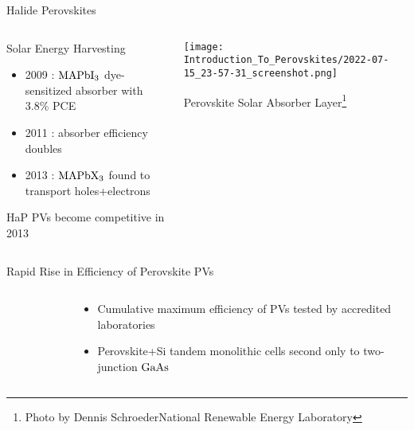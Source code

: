 \documentclass[10pt, aspectratio=169, presentation]{beamer}
\begin{document}
\begin{frame}[label={sec:org1fbe00f}]{Halide Perovskites}
\begin{columns}
\begin{column}{0.4\columnwidth}
\begin{block}{Solar Energy Harvesting}
\begin{itemize}
\item 2009 : \(\ce{MAPbI_3}\) dye-sensitized absorber with 3.8\% PCE
\autocite{kojima-2009-organ-halid}
\item 2011 : absorber efficiency doubles
\autocite{im-2011}
\item 2013 : \(\ce{MAPbX_3}\) found to transport holes+electrons
\autocite{saliba-2014-influen-therm}
\end{itemize}

HaP PVs become competitive in 2013
\end{block}
\end{column}
\begin{column}{0.6\columnwidth}
\begin{center}
\texttt{[image: Introduction\_To\_Perovskites/2022-07-15\_23-57-31\_screenshot.png]}
\end{center}
Perovskite Solar Absorber Layer\footnote{\tiny{}Photo by Dennis Schroeder\newline{}National Renewable Energy Laboratory}
\end{column}
\end{columns}
\end{frame}
\begin{frame}[label={sec:org168b2d7}]{Rapid Rise in Efficiency of Perovskite PVs}
\begin{columns}
\begin{column}{0.6\columnwidth}
 
\begin{figure}[htbp]
\centering

\caption{}
\end{figure}
\end{column}

\begin{column}{0.4\columnwidth}
\begin{itemize}
\item Cumulative maximum efficiency of PVs tested by accredited laboratories\autocite{research-2023-best-resear}
\item Perovskite+Si tandem monolithic cells second only to two-junction \(\ce{GaAs}\)
\end{itemize}
\end{column}
\end{columns}
\end{frame}
\end{document}
